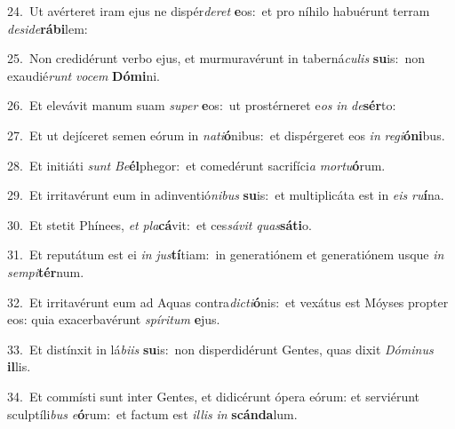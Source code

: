 {\numbfont\textcolor{\numbcolor}{24.}}~Ut avérteret iram ejus ne dispér\-\textit{de}\-\textit{ret} \textbf{e}\-os:~\star et pro níhilo habuérunt terram \textit{de}\-\textit{si}\textit{de}\textbf{rá}\textbf{bi}lem:\par
{\numbfont\textcolor{\numbcolor}{25.}}~Non credidérunt verbo ejus, et murmuravérunt in taberná\-\textit{cu}\-\textit{lis} \textbf{su}\-is:~\star non exaudié\textit{runt} \textit{vo}\-\textit{cem} \textbf{Dó}\-\textbf{mi}ni.\par
{\numbfont\textcolor{\numbcolor}{26.}}~Et elevávit manum suam \textit{su}\-\textit{per} \textbf{e}\-os:~\star ut prostérneret e\textit{os} \textit{in} \textit{de}\-\textbf{sér}to:\par
{\numbfont\textcolor{\numbcolor}{27.}}~Et ut dejíceret semen eórum in \textit{na}\-\textit{ti}\textbf{ó}nibus:~\star et dispérgeret eos \textit{in} \textit{re}\-\textit{gi}\textbf{ó}\textbf{ni}bus.\par
{\numbfont\textcolor{\numbcolor}{28.}}~Et initiáti \textit{sunt} \textit{Be}\-\textbf{él}phegor:~\star et comedérunt sacrifíci\textit{a} \textit{mor}\-\textit{tu}\textbf{ó}rum.\par
{\numbfont\textcolor{\numbcolor}{29.}}~Et irritavérunt eum in adinventió\-\textit{ni}\-\textit{bus} \textbf{su}\-is:~\star et multiplicáta est in \textit{e}\-\textit{is} \textit{ru}\-\textbf{í}na.\par
{\numbfont\textcolor{\numbcolor}{30.}}~Et stetit Phínees, \textit{et} \textit{pla}\-\textbf{cá}vit:~\star et ces\-\textit{sá}\-\textit{vit} \textit{quas}\-\textbf{sá}\textbf{ti}o.\par
{\numbfont\textcolor{\numbcolor}{31.}}~Et reputátum est ei \textit{in} \textit{jus}\-\textbf{tí}tiam:~\star in generatiónem et generatiónem usque \textit{in} \textit{sem}\-\textit{pi}\textbf{tér}num.\par
{\numbfont\textcolor{\numbcolor}{32.}}~Et irritavérunt eum ad Aquas contra\-\textit{dic}\-\textit{ti}\textbf{ó}nis:~\star et vexátus est Móyses propter eos: quia exacerbavérunt \textit{spí}\-\textit{ri}\textit{tum} \textbf{e}\-jus.\par
{\numbfont\textcolor{\numbcolor}{33.}}~Et distínxit in lá\-\textit{bi}\-\textit{is} \textbf{su}\-is:~\star non disperdidérunt Gentes, quas dixit \textit{Dó}\-\textit{mi}\textit{nus} \textbf{il}\-lis.\par
{\numbfont\textcolor{\numbcolor}{34.}}~Et commísti sunt inter Gentes, et didicérunt ópera eórum: et serviérunt sculptíli\textit{bus} \textit{e}\-\textbf{ó}rum:~\star et factum est \textit{il}\-\textit{lis} \textit{in} \textbf{scán}\-\textbf{da}lum.\par
